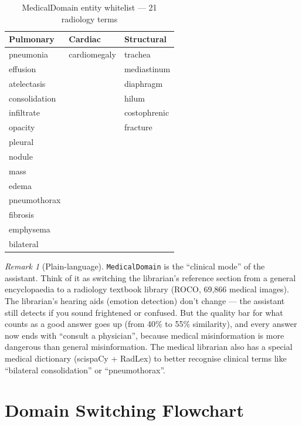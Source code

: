 \documentclass[12pt,a4paper]{article}
\theoremstyle{definition}
\theoremstyle{remark}
\newtheorem{remark}[theorem]{Remark}
\begin{document}
\begin{table}[H]
\centering
\caption{MedicalDomain entity whitelist — 21 radiology terms}
\begin{tabular}{lll}
\toprule
Pulmonary & Cardiac & Structural \\
\midrule
pneumonia & cardiomegaly & trachea \\
effusion & & mediastinum \\
atelectasis & & diaphragm \\
consolidation & & hilum \\
infiltrate & & costophrenic \\
opacity & & fracture \\
pleural & & \\
nodule & & \\
mass & & \\
edema & & \\
pneumothorax & & \\
fibrosis & & \\
emphysema & & \\
bilateral & & \\
\bottomrule
\end{tabular}
\end{table}

\begin{remark}[Plain-language]
\texttt{MedicalDomain} is the ``clinical mode'' of the assistant.
Think of it as switching the librarian's reference section from a general
encyclopaedia to a radiology textbook library (ROCO, 69,866 medical images).
The librarian's hearing aids (emotion detection) don't change —
the assistant still detects if you sound frightened or confused.
But the quality bar for what counts as a good answer goes up
(from 40\% to 55\% similarity), and every answer now ends with
``consult a physician'', because medical misinformation is more
dangerous than general misinformation.
The medical librarian also has a special medical dictionary (scispaCy +
RadLex) to better recognise clinical terms like ``bilateral consolidation''
or ``pneumothorax''.
\end{remark}

\section{Domain Switching Flowchart}
\end{document}

